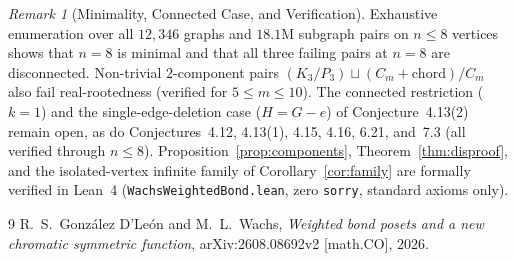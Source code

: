 \documentclass[11pt]{article}
\theoremstyle{remark}
\newtheorem{remark}[theorem]{Remark}
\begin{document}
\begin{remark}[Minimality, Connected Case, and Verification]
Exhaustive enumeration over all $12{,}346$ graphs and $18.1\text{M}$ subgraph pairs on $n \le 8$ vertices shows that $n = 8$ is minimal and that all three failing pairs at $n = 8$ are disconnected. Non-trivial $2$-component pairs $(K_3/P_3) \sqcup (C_m + \text{chord})/C_m$ also fail real-rootedness (verified for $5 \le m \le 10$). The connected restriction ($k = 1$) and the single-edge-deletion case ($H = G - e$) of Conjecture~4.13(2) remain open, as do Conjectures~4.12, 4.13(1), 4.15, 4.16, 6.21, and~7.3 (all verified through $n \le 8$). Proposition~\ref{prop:components}, Theorem~\ref{thm:disproof}, and the isolated-vertex infinite family of Corollary~\ref{cor:family} are formally verified in Lean~4 (\texttt{WachsWeightedBond.lean}, zero \texttt{sorry}, standard axioms only).
\end{remark}

\begin{thebibliography}{9}
R.~S.~Gonz\'alez D'Le\'on and M.~L.~Wachs, \emph{Weighted bond posets and a new chromatic symmetric function}, arXiv:2608.08692v2 [math.CO], 2026.
\end{thebibliography}
\end{document}

